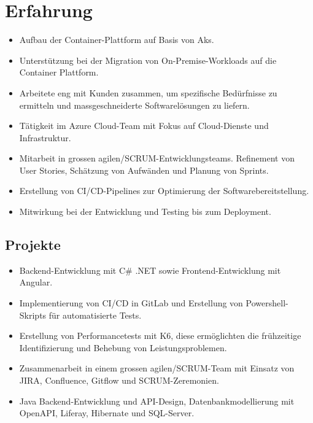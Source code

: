 \section{Erfahrung}
\begin{itemize}
    \item Aufbau der Container-Plattform auf Basis von Aks.
    \item Unterstützung bei der Migration von On-Premise-Workloads auf die Container Plattform.
\end{itemize}
\dottedline

\begin{itemize}
    \item Arbeitete eng mit Kunden zusammen, um spezifische Bedürfnisse zu ermitteln und massgeschneiderte Softwarelösungen zu liefern.
    \item Tätigkeit im Azure Cloud-Team mit Fokus auf Cloud-Dienste und Infrastruktur.
    \item Mitarbeit in grossen agilen/SCRUM-Entwicklungsteams. Refinement von User Stories, Schätzung von Aufwänden und Planung von Sprints.
    \item Erstellung von CI/CD-Pipelines zur Optimierung der Softwarebereitstellung.
    \item Mitwirkung bei der Entwicklung und Testing bis zum Deployment.
\end{itemize}
\subsection*{Projekte}
\begin{itemize}
    \item Backend-Entwicklung mit C\# .NET sowie Frontend-Entwicklung mit Angular.
    \item Implementierung von CI/CD in GitLab und Erstellung von Powershell-Skripts für automatisierte Tests.
    \item Erstellung von Performancetests mit K6, diese ermöglichten die frühzeitige Identifizierung und Behebung von Leistungsproblemen.
\end{itemize}
\dottedline

\begin{itemize}
    \item Zusammenarbeit in einem grossen agilen/SCRUM-Team mit Einsatz von JIRA, Confluence, Gitflow und SCRUM-Zeremonien.
    \item Java Backend-Entwicklung und API-Design, Datenbankmodellierung mit OpenAPI, Liferay, Hibernate und SQL-Server.
\end{itemize}
\dottedline

